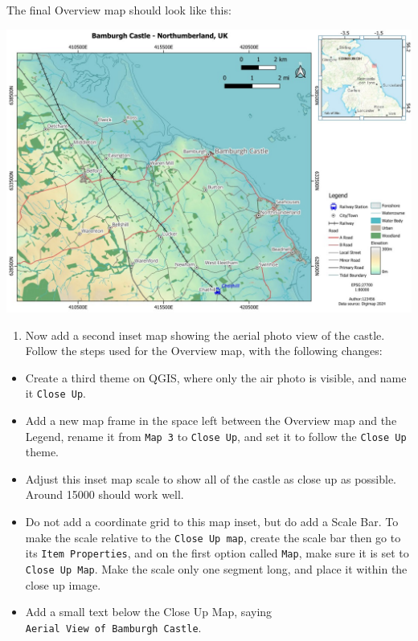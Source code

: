 \documentclass[
  letterpaper,
  DIV=11,
  numbers=noendperiod]{scrreprt}
\providecommand{\tightlist}{%
  \setlength{\itemsep}{0pt}\setlength{\parskip}{0pt}}\usepackage{longtable,booktabs,array}
\begin{document}
The final Overview map should look like this:

\includegraphics{images/lab_8/lab8_fig18_overview_map_coords.jpg}

\begin{enumerate}
\def\labelenumi{\arabic{enumi})}
\setcounter{enumi}{1}
\tightlist
\item
  Now add a second inset map showing the aerial photo view of the
  castle. Follow the steps used for the Overview map, with the following
  changes:
\end{enumerate}

\begin{itemize}
\item
  Create a third theme on QGIS, where only the air photo is visible, and
  name it \texttt{Close\ Up}.
\item
  Add a new map frame in the space left between the Overview map and the
  Legend, rename it from \texttt{Map\ 3} to \texttt{Close\ Up}, and set
  it to follow the \texttt{Close\ Up} theme.
\item
  Adjust this inset map scale to show all of the castle as close up as
  possible. Around 15000 should work well.
\item
  Do not add a coordinate grid to this map inset, but do add a Scale
  Bar. To make the scale relative to the \texttt{Close\ Up\ map}, create
  the scale bar then go to its \texttt{Item\ Properties}, and on the
  first option called \texttt{Map}, make sure it is set to
  \texttt{Close\ Up\ Map}. Make the scale only one segment long, and
  place it within the close up image.
\item
  Add a small text below the Close Up Map, saying
  \texttt{Aerial\ View\ of\ Bamburgh\ Castle}.
\end{itemize}
\end{document}
